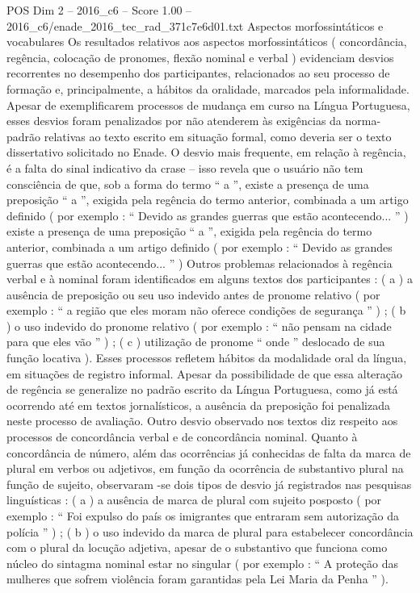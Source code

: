 \begin{textsample}{POS Dim 2 – 2016\_c6 – Score 1.00 – 2016\_c6/enade\_2016\_tec\_rad\_371c7e6d01.txt}
Aspectos morfossintáticos e vocabulares Os resultados relativos aos aspectos morfossintáticos ( concordância, regência, colocação de pronomes, flexão nominal e verbal ) evidenciam desvios recorrentes no desempenho dos participantes, relacionados ao seu processo de formação e, principalmente, a hábitos da oralidade, marcados pela informalidade.
Apesar de exemplificarem processos de mudança em curso na Língua Portuguesa, esses desvios foram penalizados por não atenderem às exigências da norma-padrão relativas ao texto escrito em situação formal, como deveria ser o texto dissertativo solicitado no Enade.
O desvio mais frequente, em relação à regência, é a falta do sinal indicativo da crase – isso revela que o usuário não tem consciência de que, sob a forma do termo “ a ”, existe a presença de uma preposição “ a ”, exigida pela regência do termo anterior, combinada a um artigo definido ( por exemplo : “ Devido as grandes guerras que estão acontecendo... ” ) existe a presença de uma preposição “ a ”, exigida pela regência do termo anterior, combinada a um artigo definido ( por exemplo : “ Devido as grandes guerras que estão acontecendo... ” ) Outros problemas relacionados à regência verbal e à nominal foram identificados em alguns textos dos participantes : ( a ) a ausência de preposição ou seu uso indevido antes de pronome relativo ( por exemplo : “ a região que eles moram não oferece condições de segurança ” ) ; ( b ) o uso indevido do pronome relativo ( por exemplo : “ não pensam na cidade para que eles vão ” ) ; ( c ) utilização de pronome “ onde ” deslocado de sua função locativa ).
Esses processos refletem hábitos da modalidade oral da língua, em situações de registro informal.
Apesar da possibilidade de que essa alteração de regência se generalize no padrão escrito da Língua Portuguesa, como já está ocorrendo até em textos jornalísticos, a ausência da preposição foi penalizada neste processo de avaliação.
Outro desvio observado nos textos diz respeito aos processos de concordância verbal e de concordância nominal.
Quanto à concordância de número, além das ocorrências já conhecidas de falta da marca de plural em verbos ou adjetivos, em função da ocorrência de substantivo plural na função de sujeito, observaram -se dois tipos de desvio já registrados nas pesquisas linguísticas : ( a ) a ausência de marca de plural com sujeito posposto ( por exemplo : “ Foi expulso do país os imigrantes que entraram sem autorização da polícia ” ) ; ( b ) o uso indevido da marca de plural para estabelecer concordância com o plural da locução adjetiva, apesar de o substantivo que funciona como núcleo do sintagma nominal estar no singular ( por exemplo : “ A proteção das mulheres que sofrem violência foram garantidas pela Lei Maria da Penha ” ).

\end{textsample}
